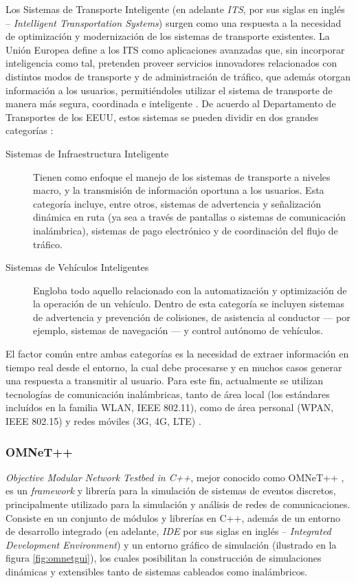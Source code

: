 \documentclass[11pt,letterpaper]{article}
\begin{document}
Los Sistemas de Transporte Inteligente (en adelante \emph{ITS}, por sus siglas en inglés -- \textit{Intelligent Transportation Systems}) surgen como una respuesta a la necesidad de optimización y modernización de los sistemas de transporte existentes. La Unión Europea define a los ITS como aplicaciones avanzadas que, sin incorporar inteligencia como tal, pretenden proveer servicios innovadores relacionados con distintos modos de transporte y de administración de tráfico, que además otorgan información a los usuarios, permitiéndoles utilizar el sistema de transporte de manera más segura, coordinada e inteligente \cite{eudirective}. De acuerdo al Departamento de Transportes de los EEUU, estos sistemas se pueden dividir en dos grandes categorías \cite{usdot}:
\begin{description}
  \item [Sistemas de Infraestructura Inteligente] Tienen como enfoque el manejo de los sistemas de transporte a niveles macro, y la transmisión de información oportuna a los usuarios. Esta categoría incluye, entre otros, sistemas de advertencia y señalización dinámica en ruta (ya sea a través de pantallas o sistemas de comunicación inalámbrica), sistemas de pago electrónico y de coordinación del flujo de tráfico.

  \item [Sistemas de Vehículos Inteligentes] Engloba todo aquello relacionado con la automatización y optimización de la operación de un vehículo. Dentro de esta categoría se incluyen sistemas de advertencia y prevención de colisiones, de asistencia al conductor --- por ejemplo, sistemas de navegación --- y control autónomo de vehículos.

\end{description}

El factor común entre ambas categorías es la necesidad de extraer información en tiempo real desde el entorno, la cual debe procesarse y en muchos casos generar una respuesta a transmitir al usuario. Para este fin, actualmente se utilizan tecnologías de comunicación inalámbricas, tanto de área local (los estándares incluídos en la familia WLAN, IEEE 802.11), como de área personal (WPAN, IEEE 802.15) y redes móviles (3G, 4G, LTE) \cite{80211dailey,80215vanet,80211wave,v2vlte}.

\subsubsection{OMNeT++}

\emph{Objective Modular Network Testbed in C++}, mejor conocido como OMNeT++ \cite{omnet}, es un \emph{framework} y librería para la simulación de sistemas de eventos discretos, principalmente utilizado para la simulación y análisis de redes de comunicaciones. Consiste en un conjunto de módulos y librerías en C++, además de un entorno de desarrollo integrado (en adelante, \emph{IDE} por sus siglas en inglés -- \emph{Integrated Development Environment}) y un entorno gráfico de simulación (ilustrado en la figura \ref{fig:omnetgui}), los cuales posibilitan la construcción de simulaciones dinámicas y extensibles tanto de sistemas cableados como inalámbricos.
\end{document}
